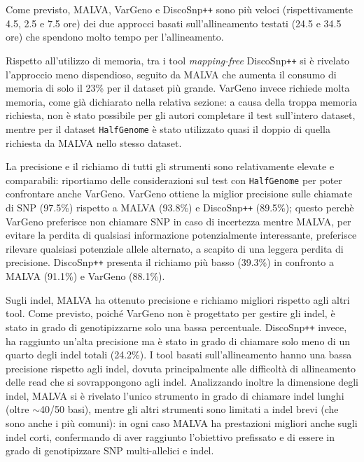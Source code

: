 \documentclass[../main.tex]{subfiles}
\begin{document}
\noindent
Come previsto, MALVA, VarGeno e DiscoSnp\texttt{++} sono più veloci (rispettivamente 4.5, 2.5 e 7.5 ore) dei due approcci basati sull'allineamento testati (24.5 e 34.5 ore) che spendono molto tempo per l'allineamento.


Rispetto all'utilizzo di memoria, tra i tool \textit{mapping-free} DiscoSnp\texttt{++} si è rivelato l'approccio meno dispendioso, seguito da MALVA che aumenta il consumo di memoria di solo il 23\% per il dataset più grande. VarGeno invece richiede molta memoria, come già dichiarato nella relativa sezione: a causa della troppa memoria richiesta, non è stato possibile per gli autori completare il test sull'intero dataset, mentre per il dataset \texttt{HalfGenome} è stato utilizzato quasi il doppio di quella richiesta da MALVA nello stesso dataset.


La precisione e il richiamo di tutti gli strumenti sono relativamente elevate e comparabili: riportiamo delle considerazioni sul test con \texttt{HalfGenome} per poter confrontare anche VarGeno. VarGeno ottiene la miglior precisione sulle chiamate di SNP (97.5\%) rispetto a MALVA (93.8\%) e DiscoSnp\texttt{++} (89.5\%); questo perchè VarGeno preferisce non chiamare SNP in caso di incertezza mentre MALVA, per evitare la perdita di qualsiasi informazione potenzialmente interessante, preferisce rilevare qualsiasi potenziale allele alternato, a scapito di una leggera perdita di precisione. DiscoSnp\texttt{++} presenta il richiamo più basso (39.3\%) in confronto a MALVA (91.1\%) e VarGeno (88.1\%).


Sugli indel, MALVA ha ottenuto precisione e richiamo migliori rispetto agli altri tool. Come previsto, poiché VarGeno non è progettato per gestire gli indel, è stato in grado di genotipizzarne solo una bassa percentuale. DiscoSnp\texttt{++} invece, ha raggiunto un'alta precisione ma è stato in grado di chiamare solo meno di un quarto degli indel totali (24.2\%). I tool basati sull'allineamento hanno una bassa precisione rispetto agli indel, dovuta principalmente alle difficoltà di allineamento delle read che si sovrappongono agli indel. Analizzando inoltre la dimensione degli indel, MALVA si è rivelato l'unico strumento in grado di chiamare indel lunghi (oltre $\sim$40/50 basi), mentre gli altri strumenti sono limitati a indel brevi (che sono anche i più comuni): in ogni caso MALVA ha prestazioni migliori anche sugli indel corti, confermando di aver raggiunto l'obiettivo prefissato e di essere in grado di genotipizzare SNP multi-allelici e indel.\\
\end{document}
